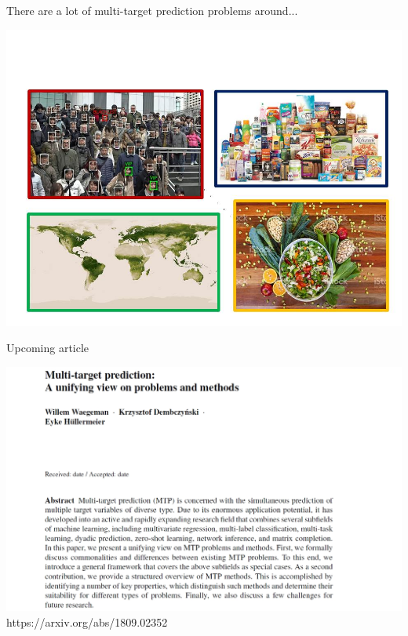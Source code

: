 \documentclass[]{beamer}
\begin{document}
\begin{frame}{There are a lot of multi-target prediction problems around...}

\begin{center}
\includegraphics[width=\textwidth,trim = 0 0 0 70,clip]{Figures/pictures/Slide20}
\end{center}

\end{frame}

\begin{frame}{Upcoming article}

\begin{center}
\includegraphics[width=\textwidth,trim = 0 0 0 0,clip]{Figures/dami}\\
https://arxiv.org/abs/1809.02352
\end{center}

\end{frame}
\end{document}
